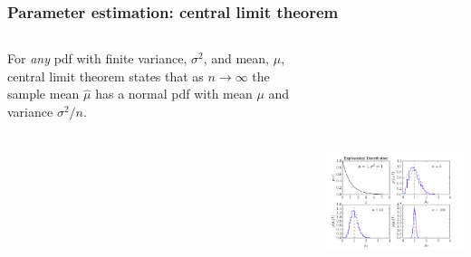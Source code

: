 \begin{frame}

\frametitle{Parameter estimation: central limit theorem}
\label{parameterestimation:centrallimittheorem}

\begin{columns}
\begin{column}{0.25\textwidth}

For \emph{any} pdf with finite variance, $\sigma^2$, and mean, $\mu$, central limit theorem states that as
$n \rightarrow \infty$ the sample mean $\hat{\mu}$ has a normal pdf with
mean $\mu$ and variance $\sigma^2/n$.
\end{column}
\begin{column}{0.75\textwidth}
\includegraphics[keepaspectratio,width=\textwidth,height=250pt]{figures/central_limit_theorem.pdf}
\end{column}
\end{columns}

\end{frame}

